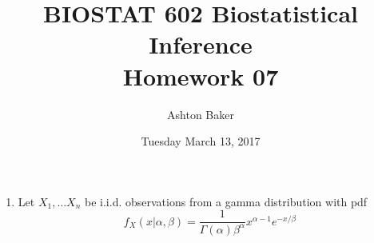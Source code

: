\documentclass[titlepage]{article}
\begin{document}
\title{BIOSTAT 602 Biostatistical Inference\\Homework 07}
\author{Ashton Baker}
\date{Tuesday March 13, 2017}
\maketitle
\begin{enumerate}
\item Let $X_1, \ldots X_n$ be i.i.d. observations from a gamma distribution with pdf
  \[f_X(x | \alpha, \beta) = \frac{1}{\Gamma(\alpha)\beta^\alpha}x^{\alpha-1}e^{-x/\beta}\]
\end{enumerate}
\end{document}
